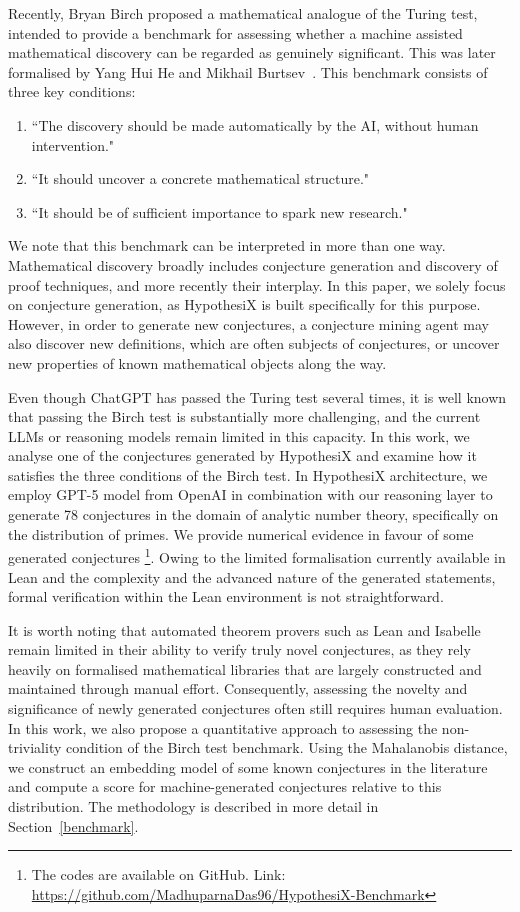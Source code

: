 \documentclass[11pt,reqno]{amsart}
\theoremstyle{plain}\newtheorem{theorem}{Theorem}[section]
\numberwithin{equation}{section}
\begin{document}
\medskip
Recently, Bryan Birch proposed a mathematical analogue of the Turing test, intended to provide a benchmark for assessing whether a machine assisted mathematical discovery can be regarded as genuinely significant. This was later formalised by Yang Hui He and Mikhail Burtsev~\cite{yangmika}. This benchmark consists of three key conditions:
\begin{enumerate}
\item ``The discovery should be made automatically by the AI, without human intervention."
\item ``It should uncover a concrete mathematical structure."
\item ``It should be of sufficient importance to spark new research."
\end{enumerate}

\medskip
\noindent
We note that this benchmark can be interpreted in more than one way. Mathematical discovery broadly includes conjecture generation and discovery of proof techniques, and more recently their interplay. In this paper, we solely focus on conjecture generation, as HypothesiX is built specifically for this purpose. However, in order to generate new conjectures, a conjecture mining agent may also discover new definitions, which are often subjects of conjectures, or uncover new properties of known mathematical objects along the way.

Even though ChatGPT has passed the Turing test several times, it is well known that passing the Birch test is substantially more challenging, and the current LLMs or reasoning models remain limited in this capacity. In this work, we analyse one of the conjectures generated by HypothesiX and examine how it satisfies the three conditions of the Birch test. In HypothesiX architecture, we employ GPT-5 model from OpenAI in combination with our reasoning layer to generate 78 conjectures in the domain of analytic number theory, specifically on the distribution of primes. We provide numerical evidence in favour of some generated conjectures \footnote{The codes are available on GitHub. Link: \url{https://github.com/MadhuparnaDas96/HypothesiX-Benchmark}}. Owing to the limited formalisation currently available in Lean and the complexity and the advanced nature of the generated statements, formal verification within the Lean environment is not straightforward.

It is worth noting that automated theorem provers such as Lean and Isabelle remain limited in their ability to verify truly novel conjectures, as they rely heavily on formalised mathematical libraries that are largely constructed and maintained through manual effort. Consequently, assessing the novelty and significance of newly generated conjectures often still requires human evaluation. In this work, we also propose a quantitative approach to assessing the non-triviality condition of the Birch test benchmark. Using the Mahalanobis distance, we construct an embedding model of some known conjectures in the literature and compute a score for machine-generated conjectures relative to this distribution. The methodology is described in more detail in Section~\ref{benchmark}.
\end{document}
